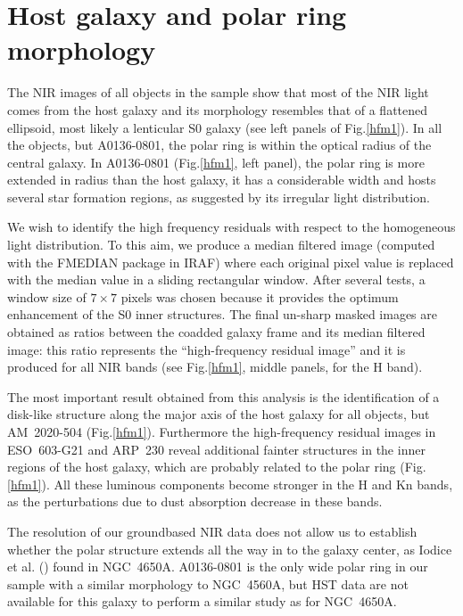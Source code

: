 \documentclass{aa}
\begin{document}
\section{Host galaxy and polar ring morphology}\label{morphology}
The NIR images of all objects in the sample show that most of the NIR  
light comes from the host galaxy and its morphology resembles that of a
flattened ellipsoid, most likely a lenticular S0 galaxy (see left panels
of Fig.\ref{hfm1}). In all the objects, but A0136-0801, the polar ring 
is within the optical radius of the central galaxy. 
In A0136-0801 (Fig.\ref{hfm1}, left panel),
the polar ring is more extended in radius than the host galaxy, it has a 
considerable width and hosts several star formation regions, as suggested 
by its irregular light distribution.

We wish to identify the high frequency residuals with respect to the 
homogeneous light distribution. To this aim, we produce a median filtered
image (computed with the 
FMEDIAN package in IRAF) where each 
original pixel value is replaced with the median value in a sliding rectangular 
window. After several tests, a window size of $7 \times 7$ pixels was chosen 
because it provides the optimum enhancement of the S0 inner structures. 
The final un-sharp masked images are obtained as ratios between the
coadded galaxy frame and its median filtered image: this ratio represents
the ``high-frequency residual image'' and it is produced for all NIR
bands (see Fig.\ref{hfm1}, middle panels, for the H band).

The most important result obtained from this analysis is the
identification of a
disk-like structure along the major axis of the host galaxy
for all objects, but AM~2020-504 (Fig.\ref{hfm1}). 
Furthermore the high-frequency residual images in ESO~603-G21 and ARP~230 reveal 
additional fainter structures in the inner regions of the host galaxy,
which are probably related to the polar ring (Fig.\ref{hfm1}).
All these luminous components become stronger in the H and Kn bands,
as the perturbations due to dust absorption decrease in these bands.

The resolution of our groundbased NIR data does not allow us 
to establish whether the polar structure extends all the way in to the
galaxy center, as Iodice et al. (\cite{4650aI}) found in NGC~4650A.
A0136-0801 is the only wide polar ring in our sample with
a similar morphology to NGC~4560A, but HST data are not available for this galaxy
to perform a similar study as for NGC~4650A.
\end{document}
